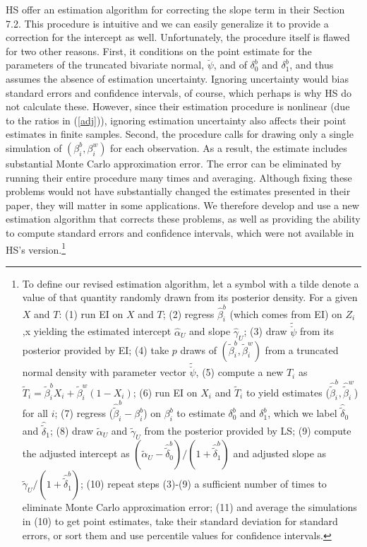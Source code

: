 \documentclass[11pt,titlepage]{article}
\newcommand{\psiu}{\breve{\psi}}
\begin{document}
HS offer an estimation algorithm for correcting the slope term in
their Section 7.2.  This procedure is intuitive and we can easily
generalize it to provide a correction for the intercept as well.
Unfortunately, the procedure itself is flawed for two other reasons.
First, it conditions on the point estimate for the parameters of the
truncated bivariate normal, $\breve\psi$, and of $\delta_0^b$ and
$\delta_1^b$, and thus assumes the absence of estimation uncertainty.
Ignoring uncertainty would bias standard errors and confidence
intervals, of course, which perhaps is why HS do not calculate these.
However, since their estimation procedure is nonlinear (due to the
ratios in (\ref{adj})), ignoring estimation uncertainty also affects
their point estimates in finite samples.  Second, the procedure calls
for drawing only a single simulation of $(\beta_i^b,\beta_i^w)$ for
each observation.  As a result, the estimate includes substantial
Monte Carlo approximation error.  The error can be eliminated by
running their entire procedure many times and averaging.  Although
fixing these problems would not have substantially changed the
estimates presented in their paper, they will matter in some
applications.  We therefore develop and use a new estimation algorithm
that corrects these problems, as well as providing the ability to
compute standard errors and confidence intervals, which were not
available in HS's version.\footnote{To define our revised estimation
  algorithm, let a symbol with a tilde denote a value of that quantity
  randomly drawn from its posterior density.  For a given $X$ and $T$:
  (1) run EI on $X$ and $T$; (2) regress $\hat\beta_i^b$ (which comes
  from EI) on $Z_i$,x yielding the estimated intercept $\hat\alpha_U$
  and slope $\hat\gamma_U$; (3) draw $\tilde\psiu$ from its posterior
  provided by EI; (4) take $p$ draws of
  $(\tilde\beta_i^b,\tilde\beta_i^w)$ from a truncated normal density
  with parameter vector $\tilde\psiu$, (5) compute a new $T_i$ as
  $\tilde T_i=\tilde\beta_i^bX_i+\tilde\beta_i^w(1-X_i)$; (6) run EI
  on $X_i$ and $\tilde T_i$ to yield estimates
  ($\hat{\tilde\beta}_i^b,\hat{\tilde\beta}_i^w$) for all $i$; (7)
  regress ($\hat{\tilde\beta}_i^b-\beta_i^b$) on $\beta_i^b$ to
  estimate $\delta_0^b$ and $\delta_1^b$, which we label
  $\hat{\tilde\delta}_0$ and $\hat{\tilde\delta}_1$; (8) draw
  $\tilde\alpha_U$ and $\tilde\gamma_U$ from the posterior provided by
  LS; (9) compute the adjusted intercept as
  $(\tilde\alpha_U-\hat{\tilde\delta}_0^b)/(1+\hat{\tilde\delta}_1^b)$
  and adjusted slope as $\tilde\gamma_U/(1+\hat{\tilde\delta}_1^b)$;
  (10) repeat steps (3)-(9) a sufficient number of times to eliminate
  Monte Carlo approximation error; (11) and average the simulations in
  (10) to get point estimates, take their standard deviation for
  standard errors, or sort them and use percentile values for
  confidence intervals.}
\end{document}
